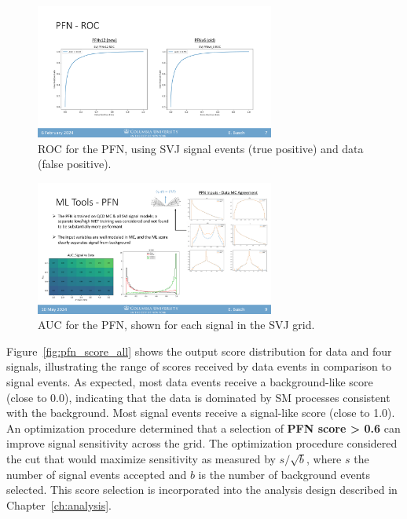 \begin{figure}[!htbp]
\centering
   \includegraphics[width=0.7\textwidth]{figures/ml/pfn_roc}
    \caption{ROC for the PFN, using SVJ signal events (true positive) and data (false positive).
    \label{fig:pfn_roc}}
\end{figure}

\begin{figure}[!htbp]
\centering
   \includegraphics[width=0.7\textwidth]{figures/ml/pfn_AUC_grid}
    \caption{AUC for the PFN, shown for each signal in the SVJ grid.
    \label{fig:pfn_AUC_score_grid}}
\end{figure}

Figure~\ref{fig:pfn_score_all} shows the output score distribution for data and four signals, illustrating the range of scores received by data events in comparison to signal events.
As expected, most data events receive a background-like score (close to 0.0), indicating that the data is dominated by SM processes consistent with the background.
Most signal events receive a signal-like score (close to 1.0).
An optimization procedure determined that a selection of \textbf{PFN score > 0.6} can improve signal sensitivity across the grid.
The optimization procedure considered the cut that would maximize sensitivity as measured by $s/\sqrt{b}$, where $s$ the number of signal events accepted and $b$ is the number of background events selected.
This score selection is incorporated into the analysis design described in Chapter~\ref{ch:analysis}. 

